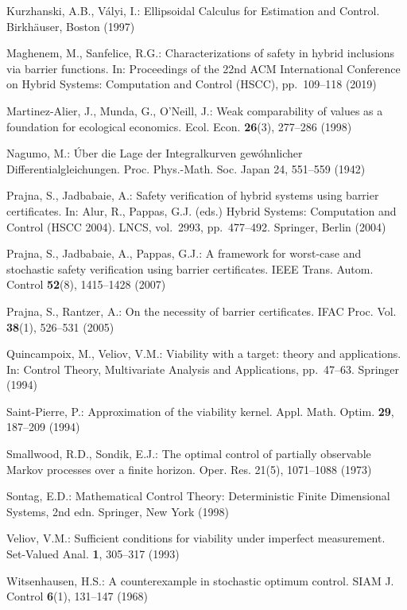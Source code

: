 \documentclass[11pt]{article}
\theoremstyle{definition}
\begin{document}
Kurzhanski, A.B., V\'alyi, I.: Ellipsoidal Calculus for Estimation and
Control. Birkh\"auser, Boston (1997)

Maghenem, M., Sanfelice, R.G.: Characterizations of safety in hybrid
inclusions via barrier functions. In: Proceedings of the 22nd ACM
International Conference on Hybrid Systems: Computation and Control
(HSCC), pp.~109--118 (2019)

Martinez-Alier, J., Munda, G., O'Neill, J.: Weak comparability of values
as a foundation for ecological economics. Ecol. Econ. \textbf{26}(3),
277--286 (1998)

Nagumo, M.: \'Uber die Lage der Integralkurven gew\'ohnlicher
Differentialgleichungen. Proc. Phys.-Math. Soc. Japan 24, 551--559
(1942)

Prajna, S., Jadbabaie, A.: Safety verification of hybrid systems using
barrier certificates. In: Alur, R., Pappas, G.J. (eds.) Hybrid Systems:
Computation and Control (HSCC 2004). LNCS, vol.~2993, pp.~477--492.
Springer, Berlin (2004)

Prajna, S., Jadbabaie, A., Pappas, G.J.: A framework for worst-case and
stochastic safety verification using barrier certificates. IEEE Trans.
Autom. Control \textbf{52}(8), 1415--1428 (2007)

Prajna, S., Rantzer, A.: On the necessity of barrier certificates. IFAC
Proc. Vol. \textbf{38}(1), 526--531 (2005)

Quincampoix, M., Veliov, V.M.: Viability with a target: theory and
applications. In: Control Theory, Multivariate Analysis and
Applications, pp.~47--63. Springer (1994)

Saint-Pierre, P.: Approximation of the viability kernel. Appl. Math.
Optim. \textbf{29}, 187--209 (1994)

Smallwood, R.D., Sondik, E.J.: The optimal control of partially
observable Markov processes over a finite horizon. Oper. Res. 21(5),
1071--1088 (1973)

Sontag, E.D.: Mathematical Control Theory: Deterministic Finite Dimensional Systems, 2nd edn. Springer, New York (1998)

Veliov, V.M.: Sufficient conditions for viability under imperfect
measurement. Set-Valued Anal. \textbf{1}, 305--317 (1993)

Witsenhausen, H.S.: A counterexample in stochastic optimum control.
SIAM J. Control \textbf{6}(1), 131--147 (1968)
\end{document}
